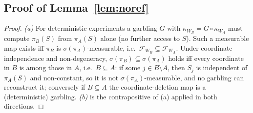\documentclass[11pt]{article}
\theoremstyle{plain}
\theoremstyle{definition}
\theoremstyle{remark}
\newcommand{\Fcal}{\mathcal{F}}
\begin{document}
\subsection*{Proof of Lemma~\ref{lem:noref}}
\begin{proof}
\emph{(a)} For deterministic experiments a garbling $G$ with $\kappa_{W_B}=G\circ\kappa_{W_A}$
must compute $\pi_B(S)$ from $\pi_A(S)$ alone (no further access to $S$). Such a measurable map
exists iff $\pi_B$ is $\sigma(\pi_A)$-measurable, i.e.\ $\Fcal_{W_B}\subseteq\Fcal_{W_A}$.
Under coordinate independence and non-degeneracy, $\sigma(\pi_B)\subseteq\sigma(\pi_A)$ holds iff
every coordinate in $B$ is among those in $A$, i.e.\ $B\subseteq A$: if some $j\in B\setminus A$,
then $S_j$ is independent of $\pi_A(S)$ and non-constant, so it is not
$\sigma(\pi_A)$-measurable, and no garbling can reconstruct it; conversely if $B\subseteq A$ the
coordinate-deletion map is a (deterministic) garbling. \emph{(b)} is the contrapositive of (a)
applied in both directions.
\end{proof}
\end{document}
